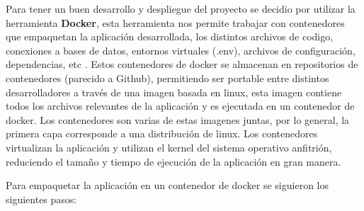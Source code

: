Para tener un buen desarrollo y despliegue del proyecto se decidio por utilizar la herramienta \textbf{Docker}, esta herramienta nos permite trabajar con contenedores que empaquetan la aplicación desarrollada, los distintos archivos de codigo, conexiones a bases de datos, entornos virtuales (.env), archivos de configuración, dependencias, etc \cite{docker-docs}. Estos contenedores de docker se almacenan en repositorios de contenedores (parecido a Github), permitiendo ser portable entre distintos desarrolladores a través de una imagen basada en linux, esta imagen contiene todos los archivos relevantes de la aplicación y es ejecutada en un contenedor de docker. Los contenedores son varias de estas imagenes juntas, por lo general, la primera capa corresponde a una distribución de linux. Los contenedores virtualizan la aplicación y utilizan el kernel del sistema operativo anfitrión, reduciendo el tamaño y tiempo de ejecución de la aplicación en gran manera.

Para empaquetar la aplicación en un contenedor de docker se siguieron los siguientes pasos:

